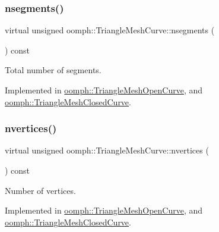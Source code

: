 \mbox{\label{classoomph_1_1TriangleMeshCurve_abb1f60baf8d94f54f409ae51417e2568}} 
\subsubsection{\texorpdfstring{nsegments()}{nsegments()}}
{\footnotesize\ttfamily virtual unsigned oomph\+::\+Triangle\+Mesh\+Curve\+::nsegments (\begin{DoxyParamCaption}{ }\end{DoxyParamCaption}) const\hspace{0.3cm}{\ttfamily [pure virtual]}}



Total number of segments. 



Implemented in \hyperlink{classoomph_1_1TriangleMeshOpenCurve_a639fc3a8b9860c98abc7c2d09f6917d8}{oomph\+::\+Triangle\+Mesh\+Open\+Curve}, and \hyperlink{classoomph_1_1TriangleMeshClosedCurve_a6d8c26d0ecfaf5abff2f68fedf158612}{oomph\+::\+Triangle\+Mesh\+Closed\+Curve}.

\mbox{\label{classoomph_1_1TriangleMeshCurve_acf002aab11af44361b39729d067efbe2}} 
\subsubsection{\texorpdfstring{nvertices()}{nvertices()}}
{\footnotesize\ttfamily virtual unsigned oomph\+::\+Triangle\+Mesh\+Curve\+::nvertices (\begin{DoxyParamCaption}{ }\end{DoxyParamCaption}) const\hspace{0.3cm}{\ttfamily [pure virtual]}}



Number of vertices. 



Implemented in \hyperlink{classoomph_1_1TriangleMeshOpenCurve_ac9671f91a0433ec5cab5a3b7dac45261}{oomph\+::\+Triangle\+Mesh\+Open\+Curve}, and \hyperlink{classoomph_1_1TriangleMeshClosedCurve_a439e4085f7e220364bbe9bc8040ec72f}{oomph\+::\+Triangle\+Mesh\+Closed\+Curve}.

